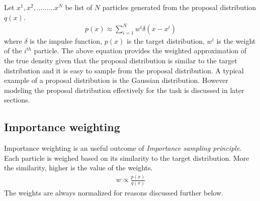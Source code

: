 Let ${x^{1},x^{2},.........x^{N}}$ be list of ${N}$ particles generated from the proposal distribution ${q(x)}$.
\begin{gather} \label{Sample}
    p(x) \approx \sum_{i = 1}^{N} w^{i}\delta (x - x^{i})  
\end{gather} 
where $\delta$ is the impulse function, ${p(x)}$ is the target distribution, ${w^i}$ is the weight of the ${i^{th}}$ particle. The above equation provides the weighted approximation of the true density given that the proposal distribution is similar to the target distribution and it is easy to sample from the proposal distribution. A typical example of a proposal distribution is the Gaussian distribution. However modeling the proposal distribution effectively for the task is discussed in later sections.

\subsection{Importance weighting}
Importance weighting is an useful outcome of \textit{Importance sampling principle}. Each particle is weighed based on its similarity to the target distribution. More the similarity, higher is the value of the weights. 
\begin{gather} \label{ImportanceWeigting}
    w \propto \frac{p(x)}{q(x)} 
\end{gather}
The weights are always normalized for reasons discussed further below.


